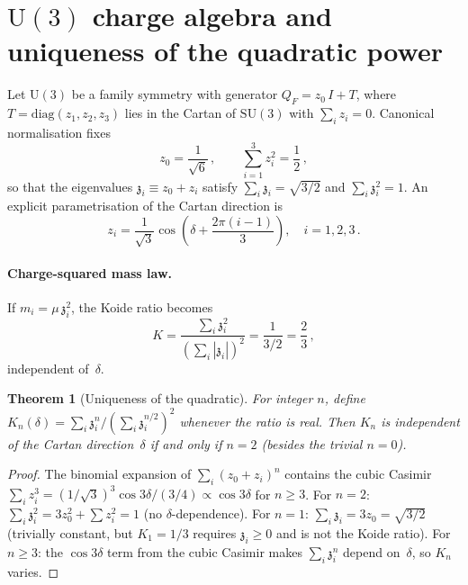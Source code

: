 \documentclass[aps,prd,twocolumn,showpacs,preprintnumbers,superscriptaddress,floatfix]{revtex4-2}
\newtheorem{theorem}{Theorem}
\newcommand{\SU}{\mathrm{SU}}
\newcommand{\UU}{\mathrm{U}}
\newcommand{\diag}{\mathrm{diag}}
\newcommand{\zch}{\mathfrak{z}}
\begin{document}
\section{$\UU(3)$ charge algebra and uniqueness of the quadratic power}
\label{app:charges}

Let $\UU(3)$ be a family symmetry with generator
$Q_F = z_0\,I + T$, where $T = \diag(z_1, z_2, z_3)$ lies in the
Cartan of $\SU(3)$ with $\sum_i z_i = 0$.
Canonical normalisation fixes
\begin{equation}
  z_0 = \frac{1}{\sqrt{6}}\,,
  \qquad
  \sum_{i=1}^{3} z_i^2 = \frac{1}{2}\,,
  \label{eq:canon}
\end{equation}
so that the eigenvalues $\zch_i \equiv z_0 + z_i$ satisfy
$\sum_i \zch_i = \sqrt{3/2}$ and $\sum_i \zch_i^2 = 1$.
An explicit parametrisation of the Cartan direction is
\begin{equation}
  z_i = \frac{1}{\sqrt{3}}
  \cos\!\left(\delta + \frac{2\pi(i-1)}{3}\right),
  \quad i = 1,2,3\,.
\end{equation}

\paragraph{Charge-squared mass law.}
If $m_i = \mu\,\zch_i^2$, the Koide ratio becomes
\begin{equation}
  K = \frac{\sum_i \zch_i^2}{(\sum_i |\zch_i|)^2}
    = \frac{1}{3/2} = \frac{2}{3}\,,
\end{equation}
independent of~$\delta$.

\begin{theorem}[Uniqueness of the quadratic]
\label{thm:unique}
For integer $n$, define
$K_n(\delta) = \sum_i \zch_i^n / (\sum_i \zch_i^{n/2})^2$
whenever the ratio is real.
Then $K_n$ is independent of the Cartan direction~$\delta$
if and only if $n = 2$ (besides the trivial $n = 0$).
\end{theorem}

\begin{proof}
The binomial expansion of $\sum_i (z_0 + z_i)^n$ contains the
cubic Casimir $\sum_i z_i^3 = (1/\sqrt{3})^3\cos 3\delta/(3/4)
\propto \cos 3\delta$ for $n \geq 3$.
For $n = 2$: $\sum_i \zch_i^2 = 3z_0^2 + \sum z_i^2 = 1$
(no $\delta$-dependence).
For $n = 1$: $\sum_i \zch_i = 3z_0 = \sqrt{3/2}$
(trivially constant, but $K_1 = 1/3$ requires $\zch_i \geq 0$
and is not the Koide ratio).
For $n \geq 3$: the $\cos 3\delta$ term from the cubic Casimir
makes $\sum_i \zch_i^n$ depend on~$\delta$, so $K_n$ varies.
\end{proof}
\end{document}
